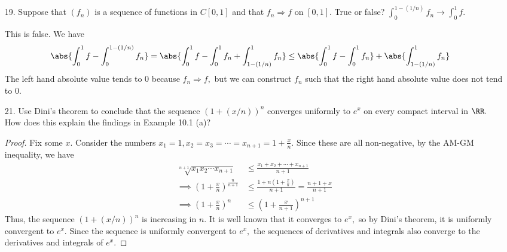\documentclass{article}
\begin{document}
\begin{itemize}
\begin{proof}
			If $X=[0, 1]$ and $f_n(x)=x^{1/n},$ then $f_n\to g$ where $g(0)=0$ and $g(x)=1$ for $x\in(0, 1].$ Here, the convergence is not uniform, but $g$ is also not continuous.
		\end{proof}

	\item[19.] Suppose that $(f_n)$ is a sequence of functions in $C[0, 1]$ and that $f_n\Rightarrow f$ on $[0, 1].$ True or false? $\int_0^{1-(1/n)} f_n\to \int_0^1 f.$
		\begin{soln}
			This is false. We have
			\begin{align*}
				\abs{\int_0^1 f - \int_0^{1-(1/n)} f_n} &= \abs{\int_0^1 f-\int_0^1 f_n + \int_{1-(1/n)}^1 f_n} \le \abs{\int_0^1 f - \int_0^1 f_n} + \abs{\int_{1-(1/n)}^1 f_n}
			\end{align*}
			The left hand absolute value tends to 0 because $f_n\Rightarrow f,$ but we can construct $f_n$ such that the right hand absolute value does not tend to 0.
		\end{soln}

	\item[21.] Use Dini's theorem to conclude that the sequence $(1+(x/n))^n$ converges uniformly to $e^x$ on every compact interval in $\RR.$ How does this explain the findings in Example 10.1 (a)?
		\begin{proof}
			Fix some $x.$ Consider the numbers $x_1=1, x_2=x_3=\cdots=x_{n+1}=1+\frac{x}{n}.$ Since these are all non-negative, by the AM-GM inequality, we have
			\begin{align*}
				\sqrt[n+1]{x_1x_2\cdots x_{n+1}} &\le \frac{x_1+x_2+\cdots+x_{n+1}}{n+1} \\
				\implies \left( 1+\frac{x}{n} \right)^{\frac{n}{n+1}} &\le \frac{1+n\left( 1+\frac{x}{n} \right)}{n+1} = \frac{n+1+x}{n+1} \\
				\implies \left( 1+\frac{x}{n} \right)^n &\le \left( 1+\frac{x}{n+1} \right)^{n+1}
			\end{align*}
			Thus, the sequence $(1+(x/n))^n$ is increasing in $n.$ It is well known that it converges to $e^x,$ so by Dini's theorem, it is uniformly convergent to $e^x.$ Since the sequence is uniformly convergent to $e^x,$ the sequences of derivatives and integrals also converge to the derivatives and integrals of $e^x.$
		\end{proof}


\end{itemize}
\end{document}
